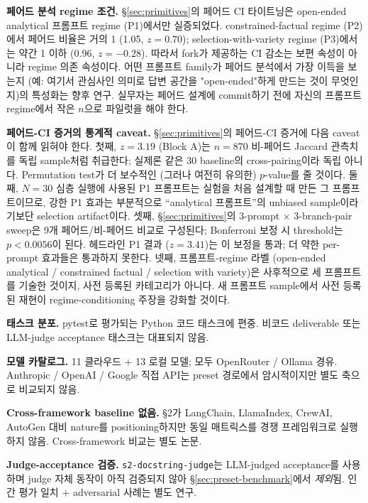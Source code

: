 \documentclass[11pt,a4paper]{article}
\begin{document}
\textbf{페어드 분석 regime 조건.} \S\ref{sec:primitives}의 페어드 CI
타이트닝은 open-ended analytical 프롬프트 regime (P1)에서만 실증되었다.
constrained-factual regime (P2)에서 페어드 비율은 거의 1 (1.05, $z=0.70$);
selection-with-variety regime (P3)에서는 약간 1 이하 (0.96, $z=-0.28$).
따라서 fork가 제공하는 CI 감소는 보편 속성이 아니라 regime 의존 속성이다.
어떤 프롬프트 family가 페어드 분석에서 가장 이득을 보는지 (예: 여기서
관심사인 의미로 답변 공간을 "open-ended"하게 만드는 것이 무엇인지)의
특성화는 향후 연구. 실무자는 페어드 설계에 commit하기 전에 자신의 프롬프트
regime에서 작은 $n$으로 파일럿을 해야 한다.

\textbf{페어드-CI 증거의 통계적 caveat.} \S\ref{sec:primitives}의
페어드-CI 증거에 다음 caveat이 함께 읽혀야 한다. 첫째, $z=3.19$
(Block A)는 $n=870$ 비-페어드 Jaccard 관측치를 독립 sample처럼
취급한다; 실제론 같은 30 baseline의 cross-pairing이라 독립 아니다.
Permutation test가 더 보수적인 (그러나 여전히 유의한) $p$-value를
줄 것이다. 둘째, $N=30$ 심층 실행에 사용된 P1 프롬프트는 실험을
처음 설계할 때 만든 그 프롬프트이므로, 강한 P1 효과는 부분적으로
``analytical 프롬프트''의 unbiased sample이라기보단 selection
artifact이다. 셋째, \S\ref{sec:primitives}의 3-prompt $\times$
3-branch-pair sweep은 9개 페어드/비-페어드 비교로 구성된다;
Bonferroni 보정 시 threshold는 $p<0.0056$이 된다. 헤드라인 P1
결과 ($z=3.41$)는 이 보정을 통과; 더 약한 per-prompt 효과들은
통과하지 못한다. 넷째, 프롬프트-regime 라벨 (open-ended analytical /
constrained factual / selection with variety)은 사후적으로 세
프롬프트를 기술한 것이지, 사전 등록된 카테고리가 아니다.
새 프롬프트 sample에서 사전 등록된 재현이 regime-conditioning
주장을 강화할 것이다.

\textbf{태스크 분포.} pytest로 평가되는 Python 코드 태스크에 편중.
비코드 deliverable 또는 LLM-judge acceptance 태스크는 대표되지 않음.

\textbf{모델 카탈로그.} 11 클라우드 + 13 로컬 모델; 모두 OpenRouter /
Ollama 경유. Anthropic / OpenAI / Google 직접 API는 preset 경로에서
암시적이지만 별도 축으로 비교되지 않음.

\textbf{Cross-framework baseline 없음.} \S2가 LangChain, LlamaIndex,
CrewAI, AutoGen 대비 nature를 positioning하지만 동일 매트릭스를 경쟁
프레임워크로 실행하지 않음. Cross-framework 비교는 별도 논문.

\textbf{Judge-acceptance 검증.} \texttt{s2-docstring-judge}는 LLM-judged
acceptance를 사용하며 judge 자체 동작이 아직 검증되지 않아
\S\ref{sec:preset-benchmark}에서 \emph{제외}됨. 인간 평가 일치 +
adversarial 사례는 별도 연구.
\end{document}
